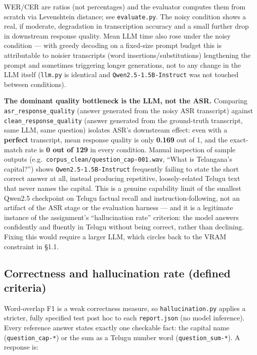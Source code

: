 \documentclass[11pt]{article}
\begin{document}
WER/CER are ratios (not percentages) and the evaluator computes them from scratch via Levenshtein distance; see \texttt{evaluate.py}. The noisy condition shows a real, if moderate, degradation in transcription accuracy and a small further drop in downstream response quality. Mean LLM time also rose under the noisy condition --- with greedy decoding on a fixed-size prompt budget this is attributable to noisier transcripts (word insertions/substitutions) lengthening the prompt and sometimes triggering longer generations, not to any change in the LLM itself (\texttt{llm.py} is identical and \texttt{Qwen2.5-1.5B-Instruct} was not touched between conditions).

\textbf{The dominant quality bottleneck is the LLM, not the ASR.} Comparing \texttt{asr\_response\_quality} (answer generated from the noisy ASR transcript) against \texttt{clean\_response\_quality} (answer generated from the ground-truth transcript, same LLM, same question) isolates ASR's downstream effect: even with a \textbf{perfect} transcript, mean response quality is only \textbf{0.169} out of 1, and the exact-match rate is \textbf{0 out of 129} in every condition. Manual inspection of sample outputs (e.g.\ \texttt{corpus\_clean/question\_cap-001.wav}, ``What is Telangana's capital?'') shows \texttt{Qwen2.5-1.5B-Instruct} frequently failing to state the short correct answer at all, instead producing repetitive, loosely-related Telugu text that never names the capital. This is a genuine capability limit of the smallest Qwen2.5 checkpoint on Telugu factual recall and instruction-following, not an artifact of the ASR stage or the evaluation harness --- and it is a legitimate instance of the assignment's ``hallucination rate'' criterion: the model answers confidently and fluently in Telugu without being correct, rather than declining. Fixing this would require a larger LLM, which circles back to the VRAM constraint in \S1.1.

\subsection{Correctness and hallucination rate (defined criteria)}

Word-overlap F1 is a weak correctness measure, so \texttt{hallucination.py} applies a stricter, fully specified test post hoc to each \texttt{report.json} (no model inference). Every reference answer states exactly one checkable fact: the capital name (\texttt{question\_cap-*}) or the sum as a Telugu number word (\texttt{question\_sum-*}). A response is:
\end{document}
